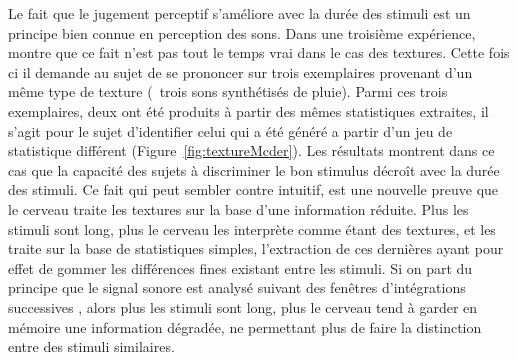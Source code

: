 Le fait que le jugement perceptif s'améliore avec la durée des stimuli est un principe bien connue en perception des sons\citep{moore1973frequency}. Dans une troisième expérience, \citep{mcdermott2013summary} montre que ce fait n'est pas tout le temps vrai dans le cas des textures. Cette fois ci il demande au sujet de se prononcer sur trois exemplaires provenant d'un même type de texture (\eg~trois sons synthétisés de pluie). Parmi ces trois exemplaires, deux ont été produits à partir des mêmes statistiques extraites, il s'agit pour le sujet d'identifier celui qui a été généré a partir d'un jeu de statistique différent (Figure~\ref{fig:textureMcder}). Les résultats montrent dans ce cas que la capacité des sujets à discriminer le bon stimulus décroît avec la durée des stimuli. Ce fait qui peut sembler contre intuitif, est une nouvelle preuve que le cerveau traite les textures sur la base d'une information réduite. Plus les stimuli sont long, plus le cerveau les interprète comme étant des textures, et les traite sur la base de statistiques simples,  l'extraction de ces dernières ayant pour effet de gommer les différences fines existant entre les stimuli. Si on part du principe que le signal sonore est analysé suivant des fenêtres d'intégrations successives \citep{yabe1998temporal,poeppel2003analysis}, alors plus les stimuli sont long, plus le cerveau tend à garder en mémoire une information dégradée, ne permettant plus de faire la distinction entre des stimuli similaires.

